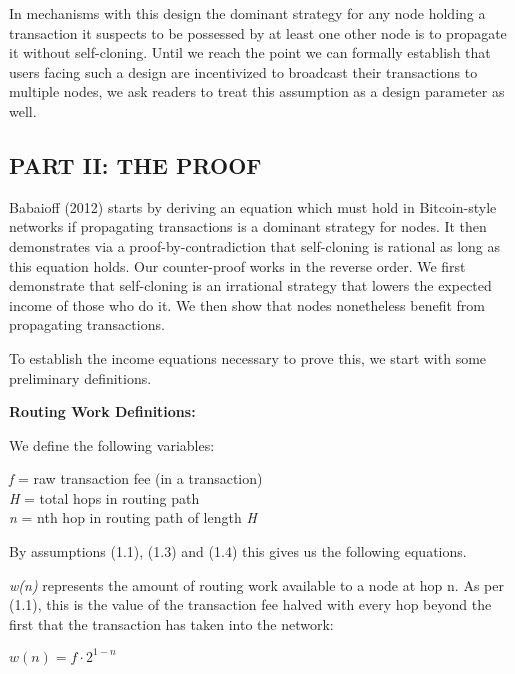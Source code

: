 \documentclass[oneside]{article}   	%
\begin{document}
\begin{multicols}{2}
\begin{enumerate}
\end{enumerate}
In mechanisms with this design the dominant strategy for any node holding a transaction it suspects to be possessed by at least one other node is to propagate it without self-cloning. Until we reach the point we can formally establish that users facing such a design are incentivized to broadcast their transactions to multiple nodes, we ask readers to treat this assumption as a design parameter as well.

\subsection*{PART II: THE PROOF}

Babaioff (2012) starts by deriving an equation which must hold in Bitcoin-style networks if propagating transactions is a dominant strategy for nodes. It then demonstrates via a proof-by-contradiction that self-cloning is rational as long as this equation holds. Our counter-proof works in the reverse order. We first demonstrate that self-cloning is an irrational strategy that lowers the expected income of those who do it. We then show that nodes nonetheless benefit from propagating transactions.

To establish the income equations necessary to prove this, we start with some preliminary definitions.

\textbf{Routing Work Definitions:}

We define the following variables:

\begin{adjustwidth}{1.5em}{1.5em} 
	\textit{f} = raw transaction fee (in a transaction) \\
	\textit{H} = total hops in routing path \\
	\textit{n} = nth hop in routing path of length \textit{H}
\end{adjustwidth}

By assumptions (1.1), (1.3) and (1.4) this gives us the following equations.

\textit{w(n)} represents the amount of routing work available to a node at hop n. As per (1.1), this is the value of the transaction fee halved with every hop beyond the first that the transaction has taken into the network:

\large
\begin{adjustwidth}{1.5em}{1.5em} 
	\begin{math}
	 w(n) = f \cdot 2^{1-n}
	\end{math}
\end{adjustwidth}
\normalsize


\end{multicols}
\end{document}
